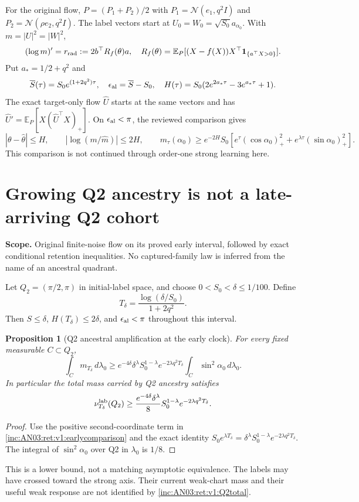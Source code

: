 \documentclass[11pt]{article}
\numberwithin{equation}{section}
\newtheorem{proposition}[theorem]{Proposition}
\theoremstyle{remark}\newtheorem{remark}[theorem]{Remark}
\newcommand{\E}{\mathbb E}
\newcommand{\dd}{\,d}
\newcommand{\1}{\mathbf 1}
\newcommand{\scope}[1]{\par\noindent\textbf{Scope.} #1\par\smallskip}
\begin{document}
For the original flow, $P=(P_1+P_2)/2$ with
$P_1=\mathcal N(e_1,q^2I)$ and $P_2=\mathcal N(\rho e_2,q^2I)$.
The label vectors start at
$U_0=W_0=\sqrt{S_0}a_{\alpha_0}$. With $m=|U|^2=|W|^2$,
\[
 (\log m)'=r_{\rm rad}:=2b^\top R_f(\theta)a,
 \quad R_f(\theta)=\E_P[(X-f(X))X^\top\1_{\{a^\top X>0\}}].
\]
Put $a_*=1/2+q^2$ and
\[
 \overline S(\tau)=S_0e^{(1+2q^2)\tau},\quad
 \epsilon_{\rm al}=\overline S-S_0,\quad
 H(\tau)=S_0(2e^{2a_*\tau}-3e^{a_*\tau}+1).
\]
The exact target-only flow $\widehat U$ starts at the same vectors and has
$\widehat U'=\E_P[X(\widehat U^\top X)_+]$.
On $\epsilon_{\rm al}<\pi$, the reviewed comparison gives
\begin{equation}\label{inc:AN03:ret:v1:earlycomparison}
 |\theta-\widehat\theta|\le H,
 \qquad |\log(m/\widehat m)|\le2H,
 \qquad
 m_\tau(\alpha_0)\ge e^{-2H}S_0
 [e^\tau(\cos\alpha_0)_+^2+e^{\lambda\tau}(\sin\alpha_0)_+^2].
\end{equation}
This comparison is not continued through order-one strong learning here.

\section{Growing Q2 ancestry is not a late-arriving Q2 cohort}
\label{inc:AN03:ret:v1:ancestry}
\scope{Original finite-noise flow on its proved early interval, followed
by exact conditional retention inequalities. No captured-family law is
inferred from the name of an ancestral quadrant.}
Let $Q_2=(\pi/2,\pi)$ in initial-label space, and choose
$0<S_0<\delta\le1/100$. Define
\[
 T_\delta=\frac{\log(\delta/S_0)}{1+2q^2}.
\]
Then $S\le\delta$, $H(T_\delta)\le2\delta$, and
$\epsilon_{\rm al}<\pi$ throughout this interval.

\begin{proposition}[Q2 ancestral amplification at the early clock]
\label{inc:AN03:ret:v1:Q2mass}
For every fixed measurable $C\subset Q_2$,
\begin{equation}\label{inc:AN03:ret:v1:Q2weighted}
 \int_Cm_{T_\delta}\dd\lambda_0
 \ge e^{-4\delta}\delta^\lambda S_0^{1-\lambda}
 e^{-2\lambda q^2T_\delta}
 \int_C\sin^2\alpha_0\dd\lambda_0.
\end{equation}
In particular the total mass carried by Q2 ancestry satisfies
\begin{equation}\label{inc:AN03:ret:v1:Q2total}
 \nu^{\rm lab}_{T_\delta}(Q_2)
 \ge \frac{e^{-4\delta}\delta^\lambda}{8}
 S_0^{1-\lambda}e^{-2\lambda q^2T_\delta}.
\end{equation}
\end{proposition}
\begin{proof}
Use the positive second-coordinate term in
\eqref{inc:AN03:ret:v1:earlycomparison} and the exact identity
$S_0e^{\lambda T_\delta}
=\delta^\lambda S_0^{1-\lambda}e^{-2\lambda q^2T_\delta}$.
The integral of $\sin^2\alpha_0$ over Q2 in $\lambda_0$ is $1/8$.
\end{proof}
This is a lower bound, not a matching asymptotic equivalence. The labels
may have crossed toward the strong axis. Their current weak-chart mass
and their useful weak response are not identified by
\eqref{inc:AN03:ret:v1:Q2total}.
\end{document}
